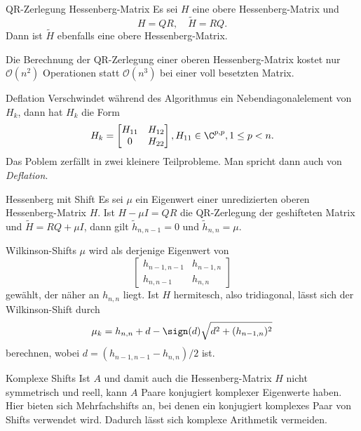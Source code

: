 \begin{karte}{QR-Zerlegung Hessenberg-Matrix}
    Es sei \(H\) eine obere Hessenberg-Matrix und 
    \[ H = QR, \quad \tilde{H} = RQ. \]
    Dann ist \(\tilde{H}\) ebenfalls eine obere Hessenberg-Matrix.

    Die Berechnung der QR-Zerlegung einer oberen Hessenberg-Matrix 
    kostet nur \( \mathcal{O}(n^2) \) Operationen statt \(\mathcal{O}(n^3)\) 
    bei einer voll besetzten Matrix.
\end{karte}

\begin{karte}{Deflation}
    Verschwindet während des Algorithmus ein Nebendiagonalelement von 
    \(H_k\), dann hat \(H_k\) die Form 
    \[ H_k = \left[ \begin{matrix}
        H_{11} & H_{12} \\ 0 & H_{22}
    \end{matrix} \right], H_{11} \in \C^{p,p}, 1\leq p < n. \]
    Das Poblem zerfällt in zwei kleinere Teilprobleme. 
    Man spricht dann auch von \textit{Deflation}.
\end{karte}

\begin{karte}{Hessenberg mit Shift}
    Es sei \(\mu\) ein Eigenwert einer unredizierten oberen Hessenberg-Matrix \(H\).
    Ist \(H - \mu I = QR\) die QR-Zerlegung der geshifteten Matrix und \( \tilde{H} = RQ + \mu I \), 
    dann gilt \( \tilde{h}_{n,n-1} = 0 \) und \( \tilde{h}_{n,n} = \mu \).
\end{karte}

\begin{karte}{Wilkinson-Shifts}
    \( \mu \) wird als derjenige Eigenwert von 
    \[ \left[ \begin{matrix}
        h_{n-1,n-1} & h_{n-1,n} \\ h_{n,n-1} & h_{n,n}
    \end{matrix} \right] \] 
    gewählt, der näher an \(h_{n,n} \) liegt. Ist \(H\) hermitesch, 
    also tridiagonal, lässt sich der Wilkinson-Shift durch 
    \[ \mu_k = h_{n,n} + d - \sign(d) \sqrt{d^2 + (h_{n-1,n})^2} \]
    berechnen, wobei \( d = (h_{n-1,n-1} - h_{n,n})/2 \) ist.
\end{karte}

\begin{karte}{Komplexe Shifts}
    Ist \(A\) und damit auch die Hessenberg-Matrix \(H\) 
    nicht symmetrisch und reell, kann \(A\) Paare konjugiert komplexer 
    Eigenwerte haben. Hier bieten sich Mehrfachshifts an, bei denen ein konjugiert 
    komplexes Paar von Shifts verwendet wird. Dadurch lässt sich komplexe Arithmetik 
    vermeiden.
\end{karte}

